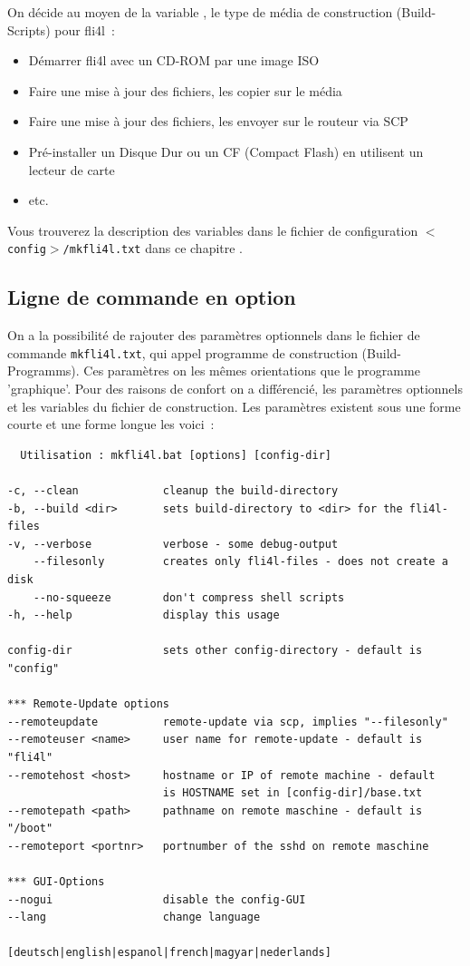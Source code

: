   On décide au moyen de la variable ,
  le type de média de construction (Build-Scripts) pour fli4l~:
  \begin{itemize}
    \item Démarrer fli4l avec un CD-ROM par une image ISO
    \item Faire une mise à jour des fichiers, les copier sur le média
    \item Faire une mise à jour des fichiers, les envoyer sur le routeur via SCP
    \item Pré-installer un Disque Dur ou un CF (Compact Flash) en
      utilisent un lecteur de carte
    \item etc.
  \end{itemize}

  Vous trouverez la description des variables dans le fichier de
  configuration \texttt{$<$config$>$/mkfli4l.txt} dans ce chapitre
  .

  \subsection{Ligne de commande en option}

  On a la possibilité de rajouter des paramètres optionnels dans le
  fichier de commande \texttt{mkfli4l.txt}, qui appel programme de construction
  (Build-Programms). Ces paramètres on les mêmes orientations que le programme
  'graphique'. Pour des raisons de confort on a différencié, les paramètres
  optionnels et les variables du fichier de construction. Les paramètres existent
  sous une forme courte et une forme longue les voici~:

  \begin{verbatim}
  Utilisation : mkfli4l.bat [options] [config-dir]

-c, --clean             cleanup the build-directory
-b, --build <dir>       sets build-directory to <dir> for the fli4l-files
-v, --verbose           verbose - some debug-output
    --filesonly         creates only fli4l-files - does not create a disk
    --no-squeeze        don't compress shell scripts
-h, --help              display this usage

config-dir              sets other config-directory - default is "config"

*** Remote-Update options
--remoteupdate          remote-update via scp, implies "--filesonly"
--remoteuser <name>     user name for remote-update - default is "fli4l"
--remotehost <host>     hostname or IP of remote machine - default
                        is HOSTNAME set in [config-dir]/base.txt
--remotepath <path>     pathname on remote maschine - default is "/boot"
--remoteport <portnr>   portnumber of the sshd on remote maschine

*** GUI-Options
--nogui                 disable the config-GUI
--lang                  change language
                        [deutsch|english|espanol|french|magyar|nederlands]

  \end{verbatim}

